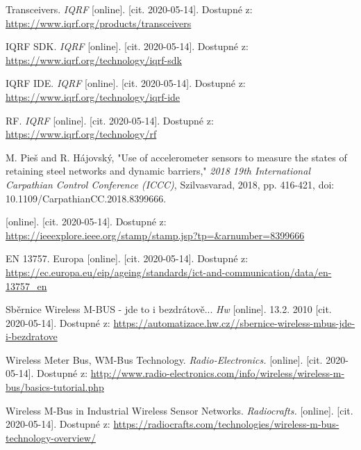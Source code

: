 \begin{thebibliography}{9}

Transceivers. \textit{ IQRF } [online]. [cit. 2020-05-14]. Dostupné z: 
\url{
https://www.iqrf.org/products/transceivers
}


IQRF SDK.
\textit{
IQRF
}
[online]. [cit. 2020-05-14]. Dostupné z: 
\url{
https://www.iqrf.org/technology/iqrf-sdk
}


IQRF IDE.
\textit{
IQRF
}
[online]. [cit. 2020-05-14]. Dostupné z: 
\url{
https://www.iqrf.org/technology/iqrf-ide
}


RF.
\textit{
IQRF
}
[online]. [cit. 2020-05-14]. Dostupné z: 
\url{
https://www.iqrf.org/technology/rf
}


M. Pieš and R. Hájovský, "Use of accelerometer sensors to measure the states of retaining steel networks and dynamic barriers," \textit{ 2018 19th International Carpathian Control Conference (ICCC)}, Szilvasvarad, 2018, pp. 416-421, doi: 10.1109/CarpathianCC.2018.8399666.

[online]. [cit. 2020-05-14]. Dostupné z: 
\url{
https://ieeexplore.ieee.org/stamp/stamp.jsp?tp=&arnumber=8399666
}
 


EN 13757. Europa [online]. [cit. 2020-05-14]. Dostupné z: 
\url{
https://ec.europa.eu/eip/ageing/standards/ict-and-communication/data/en-13757_en
}


Sběrnice Wireless M-BUS - jde to i bezdrátově... 
\textit{ Hw } [online]. 13.2. 2010 [cit. 2020-05-14]. Dostupné z: 
\url{
https://automatizace.hw.cz//sbernice-wireless-mbus-jde-i-bezdratove
}


Wireless Meter Bus, WM-Bus Technology.
\textit{
Radio-Electronics.
}
[online]. [cit. 2020-05-14]. Dostupné z: 
\url{
http://www.radio-electronics.com/info/wireless/wireless-m-bus/basics-tutorial.php
}



Wireless M-Bus in Industrial Wireless Sensor Networks.
\textit{
Radiocrafts.
}
[online]. [cit. 2020-05-14]. Dostupné z: 
\url{
https://radiocrafts.com/technologies/wireless-m-bus-technology-overview/
}



\end{thebibliography}
